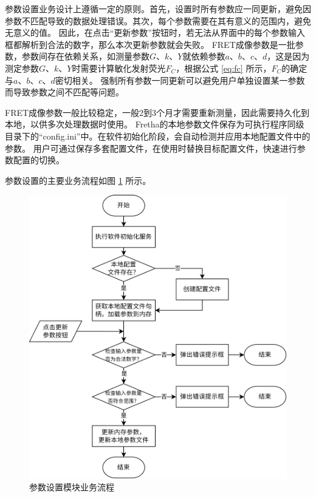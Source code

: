 参数设置业务设计上遵循一定的原则。首先，设置时所有参数应一同更新，避免因参数不匹配导致的数据处理错误。其次，每个参数需要在其有意义的范围内，避免无意义的值。
因此，在点击“更新参数”按钮时，若无法从界面中的每个参数输入框都解析到合法的数字，那么本次更新参数就会失败。
FRET成像参数是一批参数，参数间存在依赖关系，如测量参数$G$、$k$、$Y$就依赖参数$a$、$b$、$c$、$d$，这是因为测定参数$G$、$k$、$Y$时需要计算敏化发射荧光$F_C$，根据公式 \ref{eq:fc} 所示，$F_C$的确定与$a$、$b$、$c$、$d$密切相关。
强制所有参数一同更新可以避免用户单独设置某一参数而导致参数之间不匹配等问题。

FRET成像参数一般比较稳定，一般2到3个月才需要重新测量，因此需要持久化到本地，以供多次处理数据时使用。
Fretha的本地参数文件保存为可执行程序同级目录下的“config.ini”中。在软件初始化阶段，会自动检测并应用本地配置文件中的参数。
用户可通过保存多套配置文件，在使用时替换目标配置文件，快速进行参数配置的切换。

参数设置的主要业务流程如图 \ref{fig:fretha_param_module_flow} 所示。

\begin{figure}[hbtp]
    \centering
    \includegraphics[height=1\linewidth]{../figures/2/2_成像参数设置模块业务流程.png}
    \caption{参数设置模块业务流程}
    \label{fig:fretha_param_module_flow}
\end{figure}
\fi

